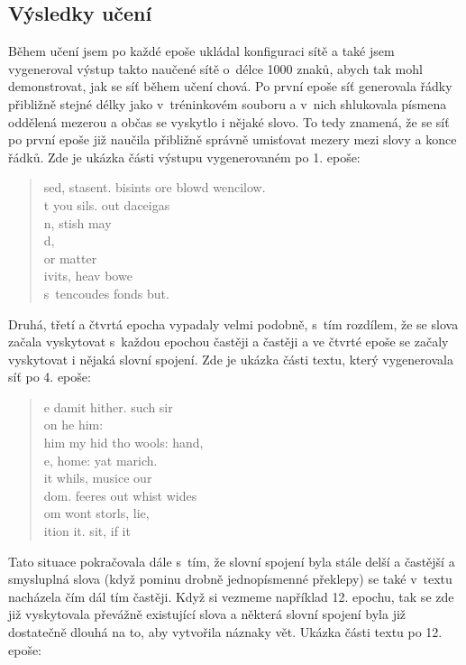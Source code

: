 \documentclass[a4paper]{article}
\begin{document}
\subsection{Výsledky učení}
Během učení jsem po každé epoše ukládal konfiguraci sítě a také jsem vygeneroval výstup takto naučené sítě o~délce 1000 znaků, abych tak mohl demonstrovat, jak se síť během učení chová. Po první epoše síť generovala řádky přibližně stejné délky jako v~tréninkovém souboru a v~nich shlukovala písmena oddělená mezerou a občas se vyskytlo i nějaké slovo. To tedy znamená, že se síť po první epoše již naučila přibližně správně umisťovat mezery mezi  slovy a konce řádků. Zde je ukázka části výstupu vygenerovaném po 1. epoše:\par
\begin{quote}
sed, stasent. bisints ore blowd wencilow.\\
t you sils. out daceigas\\
n, stish may\\
d,\\
 or matter\\
 ivits, heav bowe\\
 s~tencoudes fonds but.\\
\end{quote}
Druhá, třetí a čtvrtá epocha vypadaly velmi podobně, s~tím rozdílem, že se slova začala vyskytovat s~každou epochou častěji a častěji a ve čtvrté epoše se začaly vyskytovat i nějaká slovní spojení. Zde je ukázka části textu, který vygenerovala síť po 4. epoše:\par
\begin{quote}
e damit hither. such sir\\
on he him:\\
 him my hid tho wools: hand,\\
 e, home: yat marich.\\
 it whils, musice our\\
 dom. feeres out whist wides\\
 om wont storls, lie,\\
 ition it. sit, if it\\
\end{quote}
Tato situace pokračovala dále s~tím, že slovní spojení byla stále delší a častější a smysluplná slova (když pominu drobně jednopísmenné překlepy) se také v~textu nacházela čím dál tím častěji. Když si vezmeme například 12. epochu, tak se zde již vyskytovala převážně existující slova a některá slovní spojení byla již dostatečně dlouhá na to, aby vytvořila náznaky vět. Ukázka části textu po 12. epoše:\par
\end{document}
